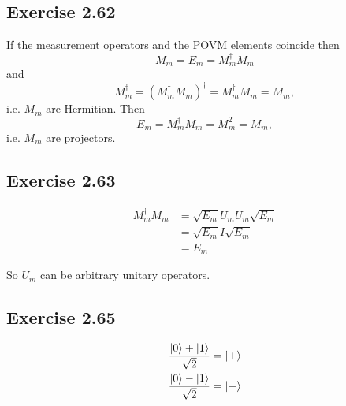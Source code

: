 \documentclass{article}
\begin{document}
\subsection*{Exercise 2.62}

If the measurement operators and the POVM elements coincide then \[M_m = E_m = M_m^\dagger M_m\] and \[M_m^\dagger = (M_m^\dagger M_m)^\dagger = M_m^\dagger M_m = M_m,\] i.e. $M_m$ are Hermitian. Then \[E_m = M_m^\dagger M_m = M_m^2 = M_m,\] i.e. $M_m$ are projectors.

\subsection*{Exercise 2.63}

\begin{align*}
  M_m^\dagger M_m & = \sqrt{E_m} U_m^\dagger U_m \sqrt{E_m} \\
                  & = \sqrt{E_m} I \sqrt{E_m}               \\
                  & = E_m
\end{align*}

So $U_m$ can be arbitrary unitary operators.

\subsection*{Exercise 2.65}

\begin{align*}
  \frac{\ket{0} + \ket{1}}{\sqrt{2}} & = \ket{+} \\
  \frac{\ket{0} - \ket{1}}{\sqrt{2}} & = \ket{-}
\end{align*}
\end{document}
